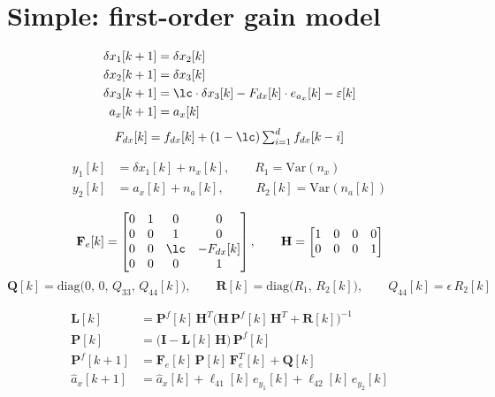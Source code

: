 \clearpage   %
\section{Simple: first-order gain model}

\[
\begin{aligned}
\delta x_1[k+1] &= \delta x_2[k] \\
\delta x_2[k+1] &= \delta x_3[k] \\
\delta x_3[k+1] &= \lc \cdot \delta x_3[k] - F_{dx}[k]\cdot e_{a_x}[k] - \varepsilon[k] \\
a_x[k+1] &= a_x[k]
\end{aligned}
\]
\[
F_{dx}[k] = f_{dx}[k] + (1-\lc)\textstyle\sum_{i=1}^{d} f_{dx}[k-i]
\]

\[
\begin{aligned}
y_1[k] &= \delta x_1[k] + n_x[k], \qquad R_1 = \mathrm{Var}(n_x) \\
y_2[k] &= a_x[k] + n_a[k], \qquad\;\; R_2[k] = \mathrm{Var}(n_a[k])
\end{aligned}
\]

\[
\mathbf{F}_e[k] =
\begin{bmatrix}
0 & 1 & 0 & 0 \\
0 & 0 & 1 & 0 \\
0 & 0 & \lc & -F_{dx}[k] \\
0 & 0 & 0 & 1
\end{bmatrix},
\qquad
\mathbf{H} =
\begin{bmatrix}
1 & 0 & 0 & 0 \\
0 & 0 & 0 & 1
\end{bmatrix}
\]
\[
\mathbf{Q}[k] = \mathrm{diag}\big(0,\, 0,\, Q_{33},\, Q_{44}[k]\big),
\qquad
\mathbf{R}[k] = \mathrm{diag}\big(R_1,\, R_2[k]\big),
\qquad
Q_{44}[k] = \epsilon\, R_2[k]
\]

\[
\begin{aligned}
\mathbf{L}[k] &= \mathbf{P}^f[k]\,\mathbf{H}^T\big(\mathbf{H}\,\mathbf{P}^f[k]\,\mathbf{H}^T + \mathbf{R}[k]\big)^{-1} \\
\mathbf{P}[k] &= \big(\mathbf{I} - \mathbf{L}[k]\,\mathbf{H}\big)\,\mathbf{P}^f[k] \\
\mathbf{P}^f[k+1] &= \mathbf{F}_e[k]\,\mathbf{P}[k]\,\mathbf{F}_e^T[k] + \mathbf{Q}[k] \\
\hat a_x[k+1] &= \hat a_x[k] + \ell_{41}[k]\,e_{y_1}[k] + \ell_{42}[k]\,e_{y_2}[k]
\end{aligned}
\]


